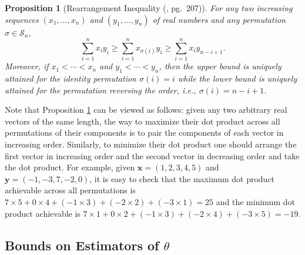 \documentclass[lettersize, 10pt]{article}
\newtheorem{prop}[thm]{Proposition}
\begin{document}
\begin{prop}[Rearrangement Inequality (\cite{Marshall2010}, pg.~207)] \label{rearrangement}
For any two increasing sequences $(x_1,\ldots,x_n)$ and $(y_1,\ldots,y_n)$ of real numbers and any permutation $\sigma\in\mathcal{S}_n$, 
\begin{equation*}
\sum_{i=1}^n x_iy_i\geqslant \sum_{i=1}^n x_{\sigma(i)} y_i \geqslant \sum_{i=1}^n x_i y_{n-i+1}.
\end{equation*}
Moreover, if $x_1< \cdots < x_n$ and $y_1<\cdots < y_n$, then the upper bound is uniquely attained for the identity permutation $\sigma(i)=i$ while the lower bound is uniquely attained for the permutation reversing the order, i.e., $\sigma(i)=n-i+1$.  
\end{prop}
Note that Proposition \ref{rearrangement} can be viewed as follows: given any two arbitrary real vectors of the same length, the way to maximize their dot product across all permutations of their components is to pair the components of each vector in increasing order. Similarly, to minimize their dot product one should arrange the first vector in increasing order and the second vector in decreasing order and take the dot product. For example, given $\mathbf{x}=(1,2,3,4,5)$ and $\mathbf{y}=(-1,-3,7,-2,0)$, it is easy to check that the maximum dot product achievable across all permutations is $7\times 5 + 0\times 4 + (-1\times 3) + (-2\times 2) +(-3\times 1) = 25$ and the minimum dot product achievable is $7\times 1 + 0\times 2 + (-1\times 3) + (-2\times 4) + (-3\times 5)=-19$.

\subsection*{Bounds on Estimators of $\theta$}
\end{document}
